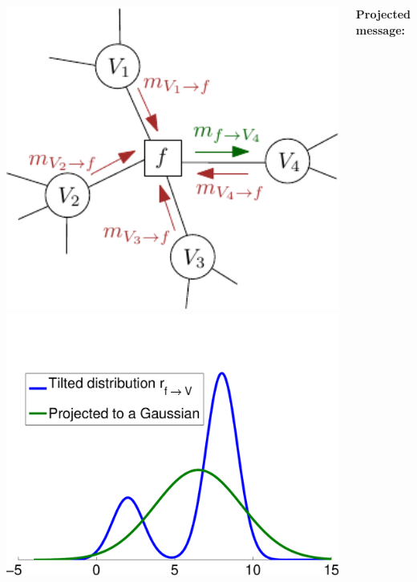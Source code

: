 \documentclass[25pt, a0paper, portrait, margin=0mm, innermargin=10mm,
     blockverticalspace=7mm, colspace=8mm, subcolspace=8mm]{tikzposter} %
\begin{document}
\begin{columns}
{\begin{tikzfigure}[]
    \vspace{-15mm}
 \includegraphics[width=17cm]{img/factor_graph-crop.pdf}
 \hspace{1cm}
 \includegraphics[width=17cm]{img/proj_demo-crop.pdf}
\end{tikzfigure}
%
\textbf{Projected message:} 

}
\end{columns}
\end{document}
